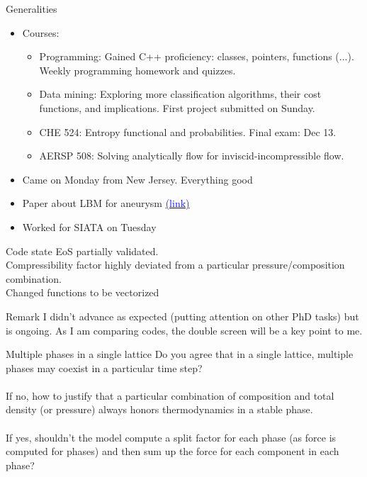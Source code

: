 \documentclass{beamer}
\begin{document}
		\begin{frame}{Generalities}
			\begin{itemize}
				\item<1-> Courses: 
				\begin{itemize}
					\item Programming: Gained C++ proficiency: classes, pointers, functions (...). Weekly programming homework and quizzes. 
					\item Data mining: Exploring more classification algorithms, their cost functions, and implications. First project submitted on Sunday.
					\item CHE 524: Entropy functional and probabilities. Final exam: Dec 13.
					\item AERSP 508: Solving analytically flow for inviscid-incompressible flow.
				\end{itemize}

				\item<2-> Came on Monday from New Jersey. Everything good
				\item<3-> Paper about LBM for aneurysm \href{https://www.mdpi.com/2311-5521/6/10/338/htm}{\textcolor{blue}{(link)}}
				\item<4-> Worked for SIATA on Tuesday
			\end{itemize}
		\end{frame}
		
		\begin{frame}{Code state}
			EoS partially validated.\\ Compressibility factor highly deviated from a particular pressure/composition combination.\\ Changed functions to be vectorized
			\begin{block}{Remark}
				I didn't advance as expected (putting attention on other PhD tasks) but is ongoing. As I am comparing codes, the double screen will be a key point to me.
			\end{block}
			
			
		\end{frame}
		
		\begin{frame}{Multiple phases in a single lattice}
			Do you agree that in a single lattice, multiple phases may coexist in a particular time step?\\~\\ \pause
			If no, how to justify that a particular combination of composition and total density (or pressure) always honors thermodynamics in a stable phase.\\~\\ \pause
			If yes, shouldn't the model compute a split factor for each phase (as force is computed for phases) and then sum up the force for each component in each phase?
		\end{frame}
		
\end{document}
